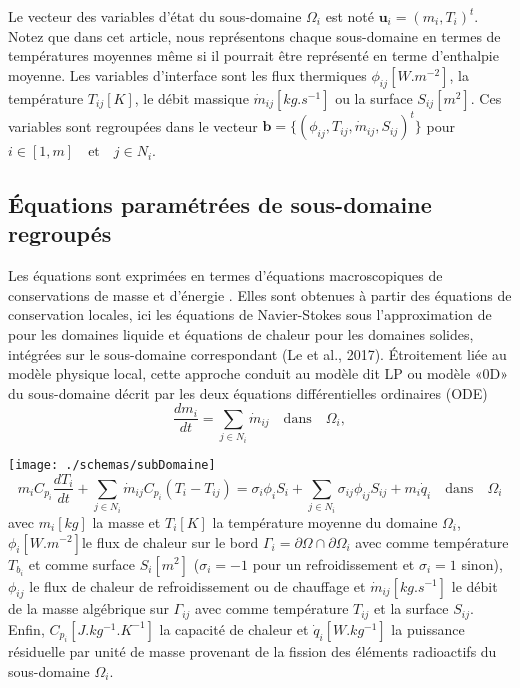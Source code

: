 \documentclass[11pt,a4paper]{scrartcl}%
\newcommand{\mtext}[1]{\quad\text{#1}\quad}%
\begin{document}
	
	
	Le vecteur des variables d'état du sous-domaine
	$\Omega_i$ est noté $\textbf{u}_i = (m_i,T_i)^t$. Notez que dans cet article, nous représentons
	chaque sous-domaine en termes de températures moyennes même si il pourrait être représenté en terme d'enthalpie moyenne.
	Les variables d’interface sont les flux thermiques $\phi_{ij}[W.m^{-2}]$, la température $T_{ij}[K]$, le débit massique $\dot{m}_{ij}[kg.s^{-1}]$ ou la surface
	$S_{ij}[m^2]$. Ces variables sont regroupées dans le vecteur $\textbf{b} = \{(\phi_{ij},T_{ij}, \dot{m}_{ij}, S_{ij})^t \}$ pour $i \in [1,m] \mtext{et} j\in N_i$.  
	
	
	\subsection{Équations paramétrées de sous-domaine regroupés}
	Les équations sont exprimées en termes d'équations macroscopiques de conservations de masse et d'énergie . Elles sont obtenues à partir des équations de conservation locales, ici les équations de Navier-Stokes sous l'approximation de  pour les domaines liquide et équations de chaleur pour les domaines solides, intégrées sur le sous-domaine correspondant (Le  et al., 2017).
	Étroitement liée au modèle physique local, cette approche conduit au modèle dit LP ou modèle «0D» du
	sous-domaine décrit par les deux équations différentielles ordinaires (ODE)
	\begin{equation}\label{eq1}
	\frac{dm_i}{dt} = \sum_{j\in N_i}\dot{m}_{ij} \mtext{dans} \Omega_i,	
	\end{equation}
	
	\texttt{[image: ./schemas/subDomaine]}\\
	\label{Fig.4}	
	\begin{equation}\label{eq2}
	m_iC_{p_i}\frac{dT_i}{dt} + \sum_{j\in N_i}\dot{m}_{ij}C_{p_i}(T_i-T_{ij}) = \sigma_i\phi_iS_i + \sum_{j\in N_i}\sigma_{ij}\phi_{ij}S_{ij} + m_i\dot{q}_i \mtext{dans} \Omega_i 
	\end{equation}
	avec $m_i [kg]$ la masse et $T_i[K]$ la température moyenne du domaine $\Omega_i$, $\phi_i[W.m^{-2}]$le flux de chaleur sur le bord $\Gamma_i = \partial\Omega\cap\partial\Omega_i$ avec comme température $T_{b_i}$ et comme surface $S_i[m^2]$ ($\sigma_i = -1$ pour un refroidissement et $\sigma_i = 1$ sinon), $\phi_{ij}$ le flux de chaleur de refroidissement ou de chauffage et $\dot{m}_{ij}[kg.s^{-1}]$ le débit de la masse algébrique sur $\Gamma_{ij}$ avec comme température $T_{ij}$ et la surface $S_{ij}$. Enfin, $C_{p_i}[J.kg^{-1}.K^{-1}]$ la capacité de chaleur et $\dot{q}_i[W.kg^{-1}]$ la puissance résiduelle par unité de masse provenant de la fission des éléments radioactifs du sous-domaine $\Omega_i$. 
\end{document}
